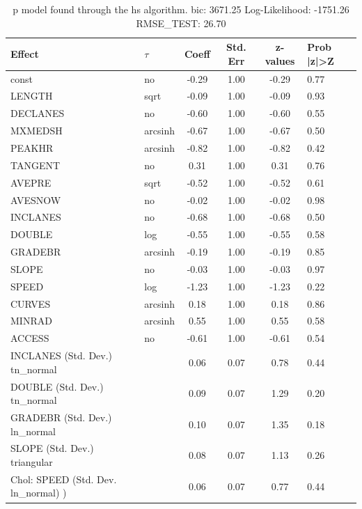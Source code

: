 \begin{table}
	\caption{p model found through the hs algorithm. bic: 3671.25 Log-Likelihood: -1751.26 RMSE_TEST: 26.70}
	\begin{center}
		\begin{tabular}{|l|l|c|c|c|l|}
			\hline
			Effect & $\tau$ & Coeff & Std. Err & z-values & Prob |z|>Z \\
			\hline
			const & no & -0.29 & 1.00 & -0.29 & 0.77 \\
			\hline
			LENGTH & sqrt & -0.09 & 1.00 & -0.09 & 0.93 \\
			\hline
			DECLANES & no & -0.60 & 1.00 & -0.60 & 0.55 \\
			\hline
			MXMEDSH & arcsinh & -0.67 & 1.00 & -0.67 & 0.50 \\
			\hline
			PEAKHR & arcsinh & -0.82 & 1.00 & -0.82 & 0.42 \\
			\hline
			TANGENT & no & 0.31 & 1.00 & 0.31 & 0.76 \\
			\hline
			AVEPRE & sqrt & -0.52 & 1.00 & -0.52 & 0.61 \\
			\hline
			AVESNOW & no & -0.02 & 1.00 & -0.02 & 0.98 \\
			\hline
			INCLANES & no & -0.68 & 1.00 & -0.68 & 0.50 \\
			\hline
			DOUBLE & log & -0.55 & 1.00 & -0.55 & 0.58 \\
			\hline
			GRADEBR & arcsinh & -0.19 & 1.00 & -0.19 & 0.85 \\
			\hline
			SLOPE & no & -0.03 & 1.00 & -0.03 & 0.97 \\
			\hline
			SPEED & log & -1.23 & 1.00 & -1.23 & 0.22 \\
			\hline
			CURVES & arcsinh & 0.18 & 1.00 & 0.18 & 0.86 \\
			\hline
			MINRAD & arcsinh & 0.55 & 1.00 & 0.55 & 0.58 \\
			\hline
			ACCESS & no & -0.61 & 1.00 & -0.61 & 0.54 \\
			\hline
			INCLANES (Std. Dev.) tn_normal &  & 0.06 & 0.07 & 0.78 & 0.44 \\
			\hline
			DOUBLE (Std. Dev.) tn_normal &  & 0.09 & 0.07 & 1.29 & 0.20 \\
			\hline
			GRADEBR (Std. Dev.) ln_normal &  & 0.10 & 0.07 & 1.35 & 0.18 \\
			\hline
			SLOPE (Std. Dev.) triangular &  & 0.08 & 0.07 & 1.13 & 0.26 \\
			\hline
			 Chol: SPEED (Std. Dev. ln_normal) ) &  & 0.06 & 0.07 & 0.77 & 0.44 \\
			\hline

\end{tabular}
\end{center}
\end{table}
